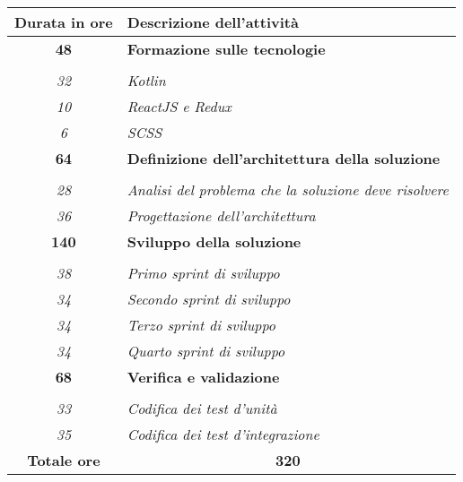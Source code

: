 

\begin{tabularx}{\textwidth}{|c|X|}
	\hline
	\textbf{Durata in ore} & \textbf{Descrizione dell'attività} \\ \hline
	
	\textbf{48} & \textbf{Formazione sulle tecnologie} \\ \hdashline 
	\multirow{3}{0cm}\\ 
	\textit{32} & 
	\textit{Kotlin} \\
	\textit{10} & 
	\textit{ReactJS e Redux} \\
	\textit{6} & 
	\textit{SCSS} \\
	\hline
  
    \textbf{64} & \textbf{Definizione dell'architettura della soluzione} \\ \hdashline 
    \multirow{3}{0cm}\\ 
    \textit{28} & 
    \textit{Analisi del problema che la soluzione deve risolvere} \\
    \textit{36} & 
    \textit{Progettazione dell'architettura} \\
    \hline
    
    \textbf{140} & \textbf{Sviluppo della soluzione} \\ \hdashline 
    \multirow{3}{0cm}\\ 
    \textit{38} & 
    \textit{Primo sprint di sviluppo} \\
    \textit{34} & 
    \textit{Secondo sprint di sviluppo} \\
    \textit{34} & 
    \textit{Terzo sprint di sviluppo} \\
    \textit{34} & 
    \textit{Quarto sprint di sviluppo} \\
    \hline
    
    \textbf{68} & \textbf{Verifica e validazione}  \\ \hdashline 
    \multirow{4}{0cm}\\ 
    \textit{33} & 
    \textit{Codifica dei test d'unità} \\
    \textit{35} & 
    \textit{Codifica dei test d'integrazione} \\
    \hline
	
	\textbf{Totale ore} & \multicolumn{1}{|c|}{\textbf{320}} \\\hline
	
	
\end{tabularx}